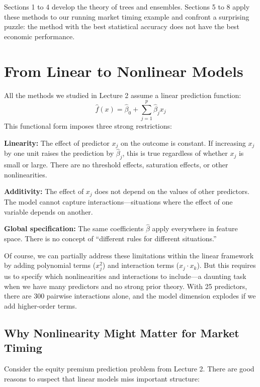 \documentclass[11pt,a4paper]{article}
\begin{document}
Sections 1 to 4 develop the theory of trees and ensembles. Sections 5 to 8 apply these methods to our running market timing example and confront a surprising puzzle: the method with the best statistical accuracy does not have the best economic performance.

\section{From Linear to Nonlinear Models}

All the methods we studied in Lecture 2 assume a linear prediction function:
\[
\widehat{f}(x) = \widehat{\beta}_0 + \sum_{j=1}^{p} \widehat{\beta}_j x_j
\]
This functional form imposes three strong restrictions:

\textbf{Linearity:} The effect of predictor $x_j$ on the outcome is constant. If increasing $x_j$ by one unit raises the prediction by $\widehat{\beta}_j$, this is true regardless of whether $x_j$ is small or large. There are no threshold effects, saturation effects, or other nonlinearities.

\textbf{Additivity:} The effect of $x_j$ does not depend on the values of other predictors. The model cannot capture interactions---situations where the effect of one variable depends on another.

\textbf{Global specification:} The same coefficients $\widehat{\beta}$ apply everywhere in feature space. There is no concept of ``different rules for different situations.''

Of course, we can partially address these limitations within the linear framework by adding polynomial terms ($x_j^2$) and interaction terms ($x_j \cdot x_k$). But this requires us to specify which nonlinearities and interactions to include---a daunting task when we have many predictors and no strong prior theory. With 25 predictors, there are 300 pairwise interactions alone, and the model dimension explodes if we add higher-order terms.

\subsection{Why Nonlinearity Might Matter for Market Timing}

Consider the equity premium prediction problem from Lecture 2. There are good reasons to suspect that linear models miss important structure:
\end{document}

